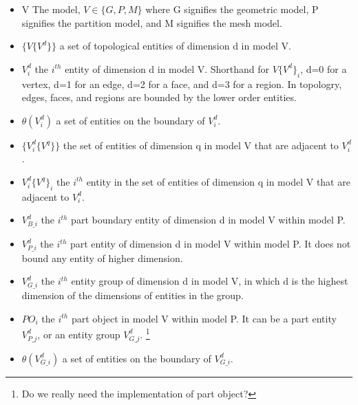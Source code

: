 
\begin{itemize}

\item{V}  The model, $V\in\{G,P,M\}$ where G signifies the
  geometric model, P signifies the partition model, and M signifies
  the mesh model. 

\item{$\{V\{V^d\}\}$} a set of topological entities of dimension d in
  model V. 

\item{$V^d_i$} the $i^{th}$ entity of dimension d in model V. Shorthand
  for $V\{V^d\}_i$, d=0 for a vertex, d=1 for an edge, d=2 for a face,
  and d=3 for a region. In topologry, edges, faces, and regions are
  bounded by the lower order entities. 

\item{$\theta(V^d_i)$} a set of entities on the boundary of $V^d_i$. 

\item{$\{V^d_i\{V^q\}\}$} the set of entities of dimension q in model
  V that are adjacent to $V^d_i$.

\item{$V^d_i\{V^q\}_i$} the $i^{th}$ entity in the set of entities of
  dimension q in model V that are adjacent to $V^d_i$. 

\item{$V^d_{B\_i}$} the $i^{th}$ part boundary entity of dimension d in
  model V within model P.                                               %
 
\item{$V^d_{P\_i}$} the $i^{th}$ part entity of dimension d in model
  V within model P. It does not bound any entity of higher dimension.   %

\item{$V^d_{G\_i}$} the $i^{th}$ entity group of dimension d in model
  V, in which d is the highest dimension of the dimensions of entities
  in the group.              %
 
\item{$PO_i$} the $i^{th}$ part object in model V within model
  P. It can be a part entity {$V^d_{P\_j}$}, or an entity group
  {$V^d_{G\_j}$}. \footnote{Do we really need the implementation of
  part object?} 

\item{$\theta(V^d_{G\_i})$} a set of entities on the boundary of
  $V^d_{G\_i}$.        %


\end{itemize}
